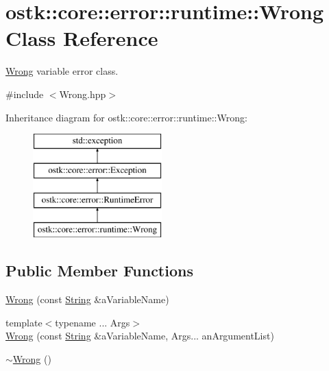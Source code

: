 \hypertarget{classostk_1_1core_1_1error_1_1runtime_1_1_wrong}{}\section{ostk\+:\+:core\+:\+:error\+:\+:runtime\+:\+:Wrong Class Reference}
\label{classostk_1_1core_1_1error_1_1runtime_1_1_wrong}


\hyperlink{classostk_1_1core_1_1error_1_1runtime_1_1_wrong}{Wrong} variable error class.  




{\ttfamily \#include $<$Wrong.\+hpp$>$}

Inheritance diagram for ostk\+:\+:core\+:\+:error\+:\+:runtime\+:\+:Wrong\+:\begin{figure}[H]
\begin{center}
\leavevmode
\includegraphics[height=4.000000cm]{classostk_1_1core_1_1error_1_1runtime_1_1_wrong}
\end{center}
\end{figure}
\subsection*{Public Member Functions}
\begin{DoxyCompactItemize}
\item 
\hyperlink{classostk_1_1core_1_1error_1_1runtime_1_1_wrong_a2e065c6ffb3877dd93fc36e897a54137}{Wrong} (const \hyperlink{classostk_1_1core_1_1types_1_1_string}{String} \&a\+Variable\+Name)
\item 
{\footnotesize template$<$typename ... Args$>$ }\\\hyperlink{classostk_1_1core_1_1error_1_1runtime_1_1_wrong_ac517c931c12598eed5d6b06272cfa303}{Wrong} (const \hyperlink{classostk_1_1core_1_1types_1_1_string}{String} \&a\+Variable\+Name, Args... an\+Argument\+List)
\item 
\hyperlink{classostk_1_1core_1_1error_1_1runtime_1_1_wrong_abc368bd88382a208840fd799fd7dc93b}{$\sim$\+Wrong} ()
\end{DoxyCompactItemize}


